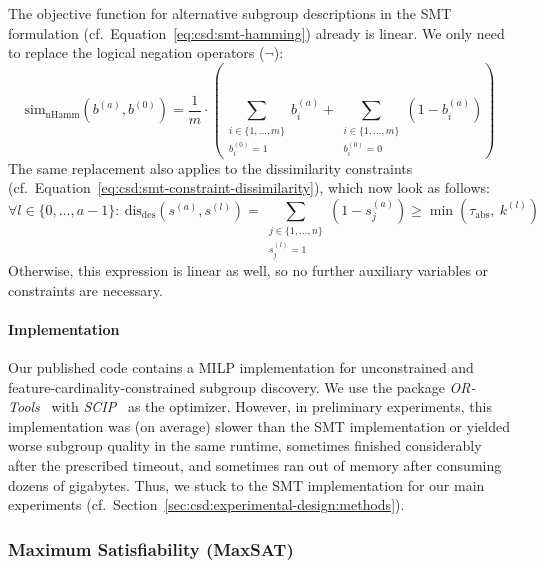 \documentclass{article}
\theoremstyle{definition}
\begin{document}
The objective function for alternative subgroup descriptions in the SMT formulation (cf.~Equation~\ref{eq:csd:smt-hamming}) already is linear.
We only need to replace the logical negation operators ($\lnot$):
%
\begin{equation}
	\text{sim}_{\text{nHamm}}(b^{(a)}, b^{(0)}) = \frac{1}{m} \cdot \left( \sum\limits_{\substack{i \in \{1, \dots, m\} \\ b_i^{(0)} = 1}} b_i^{(a)} + \sum\limits_{\substack{i \in \{1, \dots, m\} \\ b_i^{(0)} = 0}} \left( 1 - b_i^{(a)} \right) \right)
	\label{eq:csd:mip-hamming}
\end{equation}
%
The same replacement also applies to the dissimilarity constraints (cf.~Equation~\ref{eq:csd:smt-constraint-dissimilarity}), which now look as follows:
%
\begin{equation}
	\forall l \in \{0, \dots, a-1\}:~ \text{dis}_{\text{des}}(s^{(a)}, s^{(l)}) = \sum_{\substack{j \in \{1, \dots, n\} \\ s^{(l)}_j = 1}} \left(1 - s^{(a)}_j \right) \geq \min \left( \tau_{\text{abs}},~k^{(l)} \right)
	\label{eq:csd:mip-constraint-dissimilarity}
\end{equation}
%
Otherwise, this expression is linear as well, so no further auxiliary variables or constraints are necessary.

\paragraph{Implementation}

Our published code contains a MILP implementation for unconstrained and feature-cardinality-constrained subgroup discovery.
We use the package \emph{OR-Tools}~\cite{perron2022or-tools} with \emph{SCIP}~\cite{bestuzheva2021scip} as the optimizer.
However, in preliminary experiments, this implementation was (on average) slower than the SMT implementation or yielded worse subgroup quality in the same runtime, sometimes finished considerably after the prescribed timeout, and sometimes ran out of memory after consuming dozens of gigabytes.
Thus, we stuck to the SMT implementation for our main experiments (cf.~Section~\ref{sec:csd:experimental-design:methods}).

\subsubsection{Maximum Satisfiability (MaxSAT)}
\label{sec:csd:appendix:further-encodings:max-sat}
\end{document}
